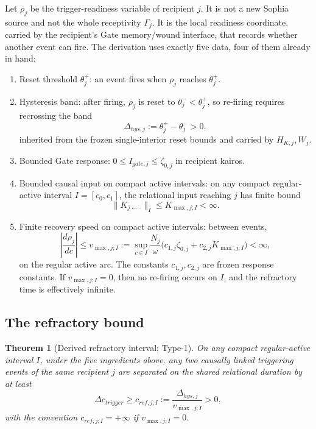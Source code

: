 \documentclass[11pt,a4paper]{article}
\def\mathfrak#1{#1}%
\def\mathrm#1{#1}%
\def\emph#1{#1}%
\theoremstyle{definition}
\theoremstyle{plain}
\newtheorem{theorem}[definition]{Theorem}
\theoremstyle{remark}
\begin{document}
Let \(\rho_j\) be the trigger-readiness variable of recipient \(j\). It is not a
new Sophia source and not the whole receptivity \(\Gamma_j\). It is the local
readiness coordinate, carried by the recipient's Gate memory/wound interface, that
records whether another event can fire. The derivation uses exactly five data,
four of them already in hand:
\begin{enumerate}[label=\textup{(\arabic*)},leftmargin=1.2cm]
\item \emph{Reset threshold} \(\theta_j^{+}\): an event fires when \(\rho_j\) reaches
\(\theta_j^{+}\).
\item \emph{Hysteresis band}: after firing, \(\rho_j\) is reset to
\(\theta_j^{-}<\theta_j^{+}\), so re-firing requires recrossing the band
\[
\Delta_{\mathrm{hys},j}:=\theta_j^{+}-\theta_j^{-}>0,
\]
inherited from the frozen single-interior reset bounds and carried by
\(H_{K,j},W_j\).
\item \emph{Bounded Gate response}: \(0\le I_{\mathrm{gate},j}\le\zeta_{0,j}\) in
recipient kairos.
\item \emph{Bounded causal input on compact active intervals}: on any compact
regular-active interval \(I=[\mathfrak c_0,\mathfrak c_1]\), the relational input
reaching \(j\) has finite bound
\[
\lVert K_{j\leftarrow\cdot}\rVert_I\le K_{\max,j;I}<\infty.
\]
\item \emph{Finite recovery speed on compact active intervals}: between events,
\[
\left|\frac{d\rho_j}{d\mathfrak c}\right|
\le
v_{\max,j;I}
:=
\sup_{\mathfrak c\in I}
\frac{N_j}{\omega}
\bigl(c_{1,j}\zeta_{0,j}+c_{2,j}K_{\max,j;I}\bigr)
<\infty,
\]
on the regular active arc. The constants \(c_{1,j},c_{2,j}\) are frozen response
constants. If \(v_{\max,j;I}=0\), then no re-firing occurs on \(I\), and the
refractory time is effectively infinite.
\end{enumerate}

\subsection{The refractory bound}

\begin{theorem}[Derived refractory interval; Type-1]\label{thm:refractory}
On any compact regular-active interval \(I\), under the five ingredients above,
any two causally linked triggering events of the same recipient \(j\) are separated
on the shared relational duration by at least
\[
\boxed{\;
\Delta\mathfrak c_{\mathrm{trigger}}
\ge
\mathfrak c_{\mathrm{ref},j;I}
:=
\frac{\Delta_{\mathrm{hys},j}}{v_{\max,j;I}}
>0,
\;}
\]
with the convention \(\mathfrak c_{\mathrm{ref},j;I}=+\infty\) if
\(v_{\max,j;I}=0\).
\end{theorem}
\end{document}
